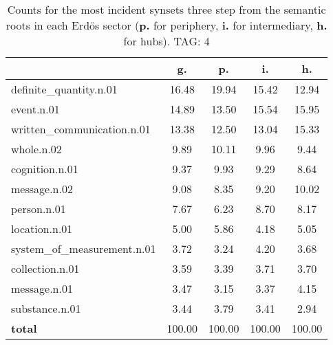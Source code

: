 \begin{table}[h!]
\begin{center}
\begin{tabular}{| l || c | c | c | c |}\hline
 & {\bf g.} & {\bf p.} & {\bf i.} & {\bf h.} \\\hline\hline
definite\_quantity.n.01 & 16.48  & 19.94  & 15.42  & 12.94 \\\hline
event.n.01 & 14.89  & 13.50  & 15.54  & 15.95 \\\hline
written\_communication.n.01 & 13.38  & 12.50  & 13.04  & 15.33 \\\hline
whole.n.02 & 9.89  & 10.11  & 9.96  & 9.44 \\\hline
cognition.n.01 & 9.37  & 9.93  & 9.29  & 8.64 \\\hline
message.n.02 & 9.08  & 8.35  & 9.20  & 10.02 \\\hline
person.n.01 & 7.67  & 6.23  & 8.70  & 8.17 \\\hline
location.n.01 & 5.00  & 5.86  & 4.18  & 5.05 \\\hline
system\_of\_measurement.n.01 & 3.72  & 3.24  & 4.20  & 3.68 \\\hline
collection.n.01 & 3.59  & 3.39  & 3.71  & 3.70 \\\hline
message.n.01 & 3.47  & 3.15  & 3.37  & 4.15 \\\hline
substance.n.01 & 3.44  & 3.79  & 3.41  & 2.94 \\\hline\hline
{{\bf total}} & 100.00  & 100.00  & 100.00  & 100.00 \\\hline
\end{tabular}
\caption{Counts for the most incident synsets three step from the semantic roots in each Erd\"os sector ({\bf p.} for periphery, {\bf i.} for intermediary, {\bf h.} for hubs). TAG: 4}
\end{center}
\end{table}